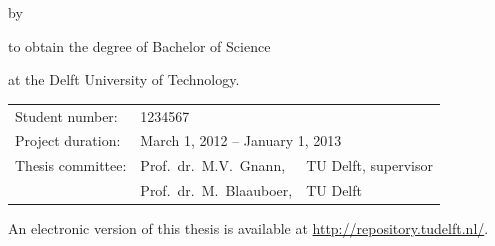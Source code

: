\begin{titlepage}


\begin{center}


{\makeatletter
\largetitlestyle\fontsize{64}{94}\selectfont\@title
\makeatother}

{\makeatletter
\ifx\@subtitle\undefined\else
    \bigskip
   {\tudsffamily\fontsize{22}{32}\selectfont\@subtitle}    
\fi
\makeatother}

\bigskip
\bigskip

by

\bigskip
\bigskip

{\makeatletter
\largetitlestyle\fontsize{26}{26}\selectfont\@author
\makeatother}

\bigskip
\bigskip

to obtain the degree of Bachelor of Science

at the Delft University of Technology.


\vfill

\begin{tabular}{lll}
    Student number: & 1234567 \\
    Project duration: & \multicolumn{2}{l}{March 1, 2012 -- January 1, 2013} \\
    Thesis committee: & Prof.\ dr.\  M.V.\ Gnann, & TU Delft, supervisor \\
        & Prof.\ dr.\ M.\ Blaauboer, & TU Delft \\
\end{tabular}


\bigskip
\bigskip
An electronic version of this thesis is available at \url{http://repository.tudelft.nl/}.


\end{center}
\end{titlepage}
